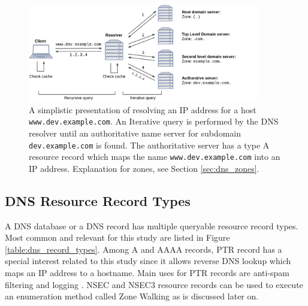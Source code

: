 \begin{figure}[htb]
  \begin{center}
    \includegraphics[width=0.9\textwidth]{resolving2.png}
    \caption{A simplistic presentation of resolving an IP address for a host \texttt{www.dev.example.com}. An Iterative query is performed by the DNS resolver until an authoritative name server for subdomain \texttt{dev.example.com} is found. The authoritative server has a type A resource record which maps the name \texttt{www.dev.example.com} into an IP address. Explanation for zones, see Section \ref{sec:dns_zones}.}
    \label{fig:resolving}
  \end{center}
\end{figure}

\subsection{DNS Resource Record Types}

A DNS database or a DNS record has multiple queryable resource record types. Most common and relevant for this study are listed in Figure \ref{table:dns_record_types}. Among A and AAAA records,  PTR record has a special interest related to this study since it allows reverse DNS lookup which maps an IP address to a hostname. Main uses for PTR records are anti-spam filtering and logging \cite{PTR_uses}. NSEC and NSEC3 resource records can be used to execute an enumeration method called Zone Walking as is discussed later on.


